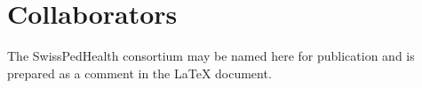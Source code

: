 \section{Collaborators}
The SwissPedHealth consortium may be named here for publication and is prepared as a comment in the LaTeX document.
